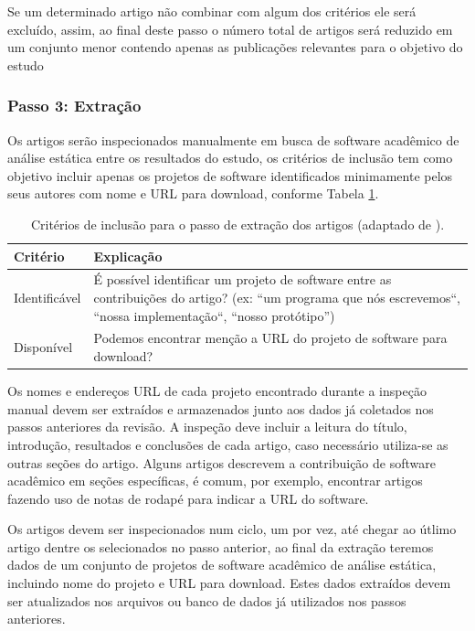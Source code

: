 Se um determinado artigo não combinar com algum dos critérios ele será
excluído, assim, ao final deste passo o número total de artigos será reduzido
em um conjunto menor contendo apenas as publicações relevantes para o objetivo
do estudo


\subsubsection{Passo 3: Extração}

Os artigos serão inspecionados manualmente em busca de software acadêmico de
análise estática entre os resultados do estudo, os critérios de inclusão tem
como objetivo incluir apenas os projetos de software identificados minimamente
pelos seus autores com nome e URL para download, conforme Tabela
\ref{criterios-extracao}.

\begin{table}[h]
\caption{Critérios de inclusão para o passo de extração dos artigos (adaptado de ).}
\centering
\begin{tabular}{ l p{12cm} }
  \hline
  Critério         & Explicação \\
  \hline
  Identificável    & É possível identificar um projeto de software entre as contribuições do artigo? (ex: ``um programa que nós escrevemos``, ``nossa implementação``, ``nosso protótipo'') \\
  Disponível       & Podemos encontrar menção a URL do projeto de software para download? \\
  \hline
\end{tabular}
\label{criterios-extracao}
\end{table}

Os nomes e endereços URL de cada projeto encontrado durante a inspeção manual
devem ser extraídos e armazenados junto aos dados já coletados nos passos
anteriores da revisão. A inspeção deve incluir a leitura do título, introdução,
resultados e conclusões de cada artigo, caso necessário utiliza-se as outras
seções do artigo. Alguns artigos descrevem a contribuição de software acadêmico
em seções específicas, é comum, por exemplo, encontrar artigos fazendo uso de
notas de rodapé para indicar a URL do software.

Os artigos devem ser inspecionados num ciclo, um por vez, até chegar ao útlimo
artigo dentre os selecionados no passo anterior, ao final da extração teremos
dados de um conjunto de projetos de software acadêmico de análise estática,
incluindo nome do projeto e URL para download. Estes dados extraídos devem ser
atualizados nos arquivos ou banco de dados já utilizados nos passos anteriores.

